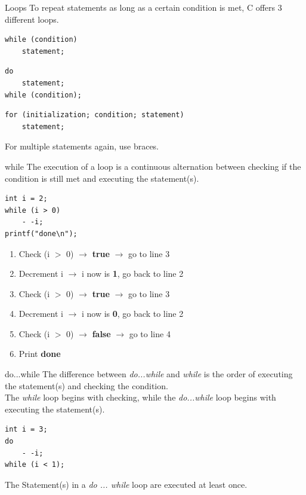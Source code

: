 \begin{frame}[fragile]{Loops}
	To repeat statements as long as a certain condition is met, C offers 3 different loops.
	\begin{lstlisting}[numbers=none,basicstyle=\itshape\footnotesize]
while (condition)
    statement;
    \end{lstlisting}
	\begin{lstlisting}[numbers=none,basicstyle=\itshape\footnotesize]
do
    statement;
while (condition);
    \end{lstlisting}
	\begin{lstlisting}[numbers=none,basicstyle=\itshape\footnotesize]
for (initialization; condition; statement)
    statement;
    \end{lstlisting}
	For multiple statements again, use braces.
\end{frame}

\begin{frame}[fragile]{while}
	The execution of a loop is a continuous alternation between checking if the condition is still met and executing the statement(s).
	\begin{lstlisting}
int i = 2;
while (i > 0)
	- -i;
printf("done\n");
\end{lstlisting}
	\begin{enumerate}[<+(1)->]
		\item Check (i $>$ 0) $\rightarrow$ \textbf{true} $\rightarrow$ go to line 3
		\item Decrement i $\rightarrow$ i now is \textbf{1}, go back to line 2
		\item Check (i $>$ 0) $\rightarrow$ \textbf{true} $\rightarrow$ go to line 3
		\item Decrement i $\rightarrow$ i now is \textbf{0}, go back to line 2
		\item Check (i $>$ 0) $\rightarrow$ \textbf{false} $\rightarrow$ go to line 4
		\item Print \textbf{done}
	\end{enumerate}
\end{frame}

\begin{frame}[fragile]{do...while}
	The difference between \textit{do...while} and \textit{while} is the order of executing the statement(s) and checking the condition.\\
	\bigskip
	The \textit{while} loop begins with checking, while the \textit{do...while} loop begins with executing the statement(s).
	\begin{lstlisting}[numbers=none]
int i = 3;
do
	- -i;
while (i < 1);
\end{lstlisting}
	\bigskip
	The Statement(s) in a \textit{do ... while} loop are executed at least once.
\end{frame}

